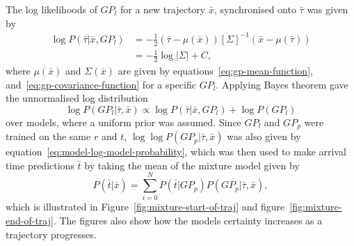 The log likelihoods of $GP_l$ for a new trajectory $\bar{x}$,
synchronised onto $\bar{\tau}$ was given by
\begin{equation}
  \label{eq:model-log-likelihood}
  \begin{split}
    \log P(\bar{\tau}|\bar{x}, {GP_l}) & = -\frac{1}{2}(\bar{\tau} - \mu(\bar{x})){[\Sigma]}^{-1}(\bar{x} - \mu(\bar{\tau})) \\
    & = -\frac{1}{2}\log{|\Sigma|}+C,
  \end{split}
\end{equation}
where $\mu(\bar{x})$ and $\Sigma(\bar{x})$ are given by
equations~\ref{eq:gp-mean-function},
and~\ref{eq:gp-covariance-function} for a specific ${GP_l}$. Applying Bayes
theorem gave the unnormalised log distribution
\begin{equation}
  \label{eq:model-log-model-probability}
  \log P(GP_l | \bar{\tau}, \bar{x}) \propto \log P(\bar{\tau}|\bar{x}, GP_l) + \log P(GP_l)
\end{equation}
over models, where a uniform prior was assumed. Since
${GP_l}$ and $GP_p$ were trained on the same $r$ and $t$, $\log
\log P(GP_p | \bar{\tau}, \bar{x})$ was also given by
equation~\ref{eq:model-log-model-probability}, which was then used to make 
arrival time predictions $\bar{t}$ by taking the mean of the mixture
model given by
\begin{equation}
  \label{eq:model-mixture}
  P(\bar{t}|\bar{x}) = \sum_{i=0}^{N}{P(\bar{t}|GP_p)P(GP_p | \bar{\tau},\bar{x})},
\end{equation}
which is illustrated in Figure~\ref{fig:mixture-start-of-traj} and
figure~\ref{fig:mixture-end-of-traj}. The figures also show how the models certainty
increases as a trajectory progresses.

